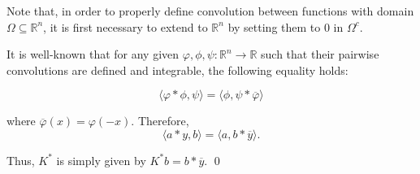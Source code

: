 \documentclass[twocolumn,twoside,a4paper,10pt]{IEEEtran}
\begin{document}
Note that, in order to properly define convolution between functions with domain \(\Omega\subseteq\mathbb{R}^n\), it is first necessary to extend to \(\mathbb{R}^n\) by setting them to \(0\) in \(\Omega^c\).

It is well-known that for any given \(\varphi, \phi, \psi\colon\mathbb{R}^n\to\mathbb{R}\) such that their pairwise convolutions are defined and integrable, the following equality holds:

\begin{equation}\label{eq:convolution/inversion}
  \langle\varphi\ast\phi, \psi\rangle = \langle\phi, \psi\ast\overline{\varphi}\rangle
\end{equation}

where \(\overline{\varphi}(x) = \varphi(-x)\). Therefore,
\[
  \langle a\ast y, b\rangle = \langle a, b\ast\overline{y} \rangle
.\]

Thus, \(K^*\) is simply given by \(K^*b = b\ast \overline{y}\). \qed


\end{document}
